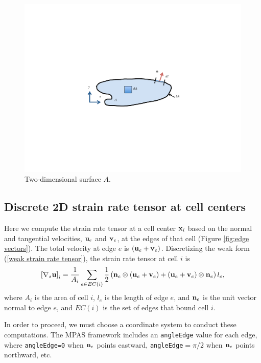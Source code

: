 \documentclass[11pt]{report}
\begin{document}
\begin{figure}[htbp]
 \center
 \includegraphics[trim=3.2in 3.2in 3.0in 3.5in, clip=true, scale=0.8]{f/A_surface.pdf}
 \caption{Two-dimensional surface $A$.}
 \label{fig:2D domain}
\end{figure}

\subsection{Discrete 2D strain rate tensor at cell centers}

Here we compute the strain rate tensor at a cell center ${\bf x}_i$ based on the normal and tangential velocities, ${\bf u}_e$ and ${\bf v}_e$, at the edges of that cell (Figure \ref{fig:edge vectors}).  The total velocity at edge $e$ is $({\bf u}_e + {\bf v}_e)$.  Discretizing the weak form (\ref{weak strain rate tensor}), the strain rate tensor at cell $i$ is
\begin{equation}
\label{cell strain rate tensor}
\left[\nabla_s {\bf u} \right]_i
= 
\frac{1}{A_i} 
\sum_{e\in EC(i)}{\frac{1}{2}\left( 
  {\bf n}_e\otimes\left({\bf u}_e +{\bf v}_e \right)
+ \left({\bf u}_e +{\bf v}_e \right)\otimes{\bf n}_e\right)l_e },
\end{equation}
where $A_i$ is the area of cell $i$, $l_e$ is the length of edge $e$, and ${\bf n}_e$ is the unit vector normal to edge $e$, and $EC(i)$ is the set of edges that bound cell $i$.

In order to proceed, we must choose a coordinate system to conduct these computations.  The MPAS framework includes an \verb|angleEdge| value for each edge, where \verb|angleEdge=0| when ${\bf n}_e$ points eastward, \verb|angleEdge|$=\pi/2$ when ${\bf n}_e$ points northward, etc.  
\end{document}
